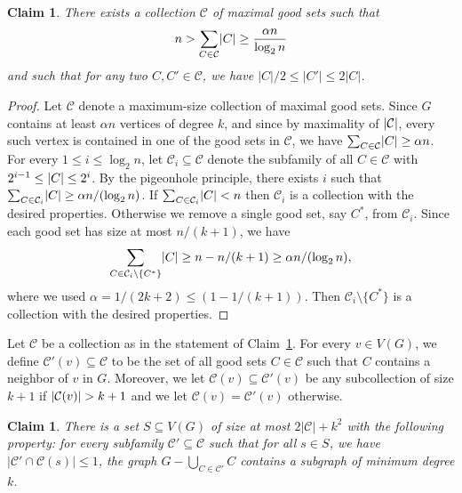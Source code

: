 \documentclass[11pt]{article}
\numberwithin{theorem}{section}
\newtheorem{claim}[theorem]{Claim}
\DeclarePairedDelimiter\abs{\lvert}{\rvert}
\begin{document}
\begin{claim}\label{claim:collection}
  There exists a collection $\mathcal C$ of maximal good sets such that
  \[ n > \sum_{C\in \mathcal C} \abs{C} \geq \frac{\alpha n}{\log_2 n}\]
  and such that for any two $C,C'\in \mathcal C$, we have
  $|C|/2 \leq |C'| \leq 2 |C|$.
\end{claim}
\begin{proof}
  Let $\mathcal C$ denote a maximum-size collection of maximal good sets. Since
  $G$ contains at least $\alpha n$ vertices of degree $k$, and since by
  maximality of $\abs{\mathcal C}$, every such vertex is contained in one of
  the good sets in $\mathcal C$, we have $\sum_{C\in\mathcal C} \abs{C} \geq
  \alpha n$. For every $1\leq i \leq \log_2 n$, let $\mathcal C_i\subseteq
  \mathcal C$ denote the subfamily of all $C\in \mathcal C$ with $2^{i-1}\leq
  \abs C \leq 2^{i}$. By the pigeonhole principle, there exists $i$ such that
  $\sum_{C\in\mathcal C_i} \abs{C} \geq \alpha n/(\log_2 n)$.
  If $\sum_{C\in\mathcal C_i} \abs{C} < n$ then
  $\mathcal C_i$ is a collection with the desired properties.
  Otherwise we remove a single good set, say $C^*$, from $\mathcal C_i$. Since
  each good set has size at most $n/(k+1)$, we have
  \[ \sum_{C\in \mathcal C_i\setminus \{C^*\}} \abs{C} \geq n-n/(k+1) \geq
  \alpha n/(\log_2 n),\]
  where we used $\alpha = 1/(2k+2) \leq (1-1/(k+1))$.
  Then $\mathcal C_i\setminus \{C^*\}$ is a collection with the desired properties.
\end{proof}

Let $\mathcal C$ be a collection as in the statement of
Claim~\ref{claim:collection}. For every $v\in V(G)$, we define $\mathcal
C'(v)\subseteq \mathcal C$ to be the set of all good sets $C\in \mathcal C$
such that $C$ contains a neighbor of $v$ in $G$. Moreover, we let $\mathcal
C(v)\subseteq \mathcal C'(v)$ be any subcollection of size $k+1$ if
$\abs{\mathcal C(v)}> k+1$ and we let $\mathcal C(v) = \mathcal C'(v)$
otherwise.

\begin{claim}\label{claim:cover}
  There is a set $S\subseteq V(G)$ of size at most
  $2|\mathcal C|+k^2$ with the following property:
  for every subfamily $\mathcal C' \subseteq \mathcal C$ 
  such that for all $s\in S$, we have $|\mathcal C' \cap \mathcal C(s)|\leq 1$,
  the graph $G-\bigcup_{C\in
  \mathcal C'}C$ contains a subgraph of minimum degree $k$.
\end{claim}
\end{document}
